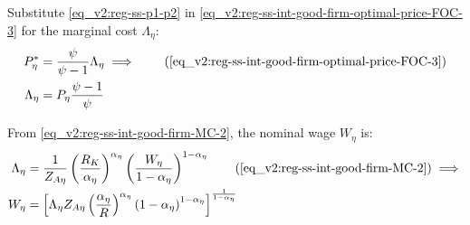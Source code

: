 \documentclass[../thesis.tex]{subfiles}
\begin{document}
\begin{comment}
	Substitute \ref{eq_v2:reg-ss-q1} in \ref{eq_v2:reg-ss-total-expense-level-2}:
	\begin{align}
		Q_{2} &= Q_{1} \frac{\omega_{11}^{\omega_{11}} (1 - \omega_{11})^{1 - \omega_{11}}}{\omega_{21}^{\omega_{21}} (1 -\omega_{21})^{1 -\omega_{21}}} \tag{\ref{eq_v2:reg-ss-total-expense-level-2}} \implies \\
		Q_{2} &= \frac{P_{1} \theta_{P}^{1 - \omega_{11}}}{\omega_{21}^{\omega_{21}} (1 - \omega_{21})^{1 - \omega_{21}}} \label{eq_v2:reg-ss-q2}
	\end{align}
\end{comment}

Substitute \ref{eq_v2:reg-ss-p1-p2} in \ref{eq_v2:reg-ss-int-good-firm-optimal-price-FOC-3} for the marginal cost $\Lambda_{\eta}$:
\begin{align}
	P_{\eta}^{\ast} &= \frac{\psi}{\psi-1} \Lambda_{\eta} \implies \tag{\ref{eq_v2:reg-ss-int-good-firm-optimal-price-FOC-3}} \\
	\Lambda_{\eta} &= P_{\eta} \frac{\psi-1}{\psi} \label{eq_v2:reg-ss-marginal-cost}
\end{align}

From \ref{eq_v2:reg-ss-int-good-firm-MC-2}, the nominal wage $W_{\eta}$ is:
\begin{alignat}{2}
	\Lambda_{\eta} &= \frac{1}{Z_{A\eta}} \left( \frac{R_{K}}{{\alpha_{\eta}}} \right)^{{\alpha_{\eta}}} \left( \frac{W_{\eta}}{1-\alpha_{\eta}} \right)^{1-\alpha_{\eta}} \tag{\ref{eq_v2:reg-ss-int-good-firm-MC-2}} \implies \\
	W_{\eta} &= \left[ \Lambda_{\eta} Z_{A\eta} \left( \frac{\alpha_{\eta}}{R} \right)^{\alpha_{\eta}} \left( 1 - \alpha_{\eta} \right)^{1 - \alpha_{\eta}} \right]^{\frac{1}{1 - \alpha_{\eta}}} \label{eq_v2:reg-ss-nominal-wage}
\end{alignat}

\begin{comment}
	Substitute \ref{eq_v2:reg-ss-nominal-wage} in \ref{eq_v2:reg-ss-int-good-firm-MC-2} for the technology level of region 2, $Z_{A2}$:
	\begin{align}
		\Lambda_{\eta} &= \frac{1}{Z_{A\eta}} \left( \frac{R_K}{{\alpha_{\eta}}} \right)^{{\alpha_{\eta}}} \left( \frac{W}{1-\alpha_{\eta}} \right)^{1-\alpha_{\eta}} \implies \tag{\ref{eq_v2:reg-ss-int-good-firm-MC-2}} \\
		Z_{A2} &= \frac{1}{\Lambda_{}} \left( \frac{R_K}{{\alpha_{\eta}}} \right)^{{\alpha_{\eta}}} \left( \frac{W}{1-\alpha_{\eta}} \right)^{1-\alpha_{\eta}} \label{eq_v2:reg-ss-za2}
	\end{align}
\end{comment}
\end{document}
